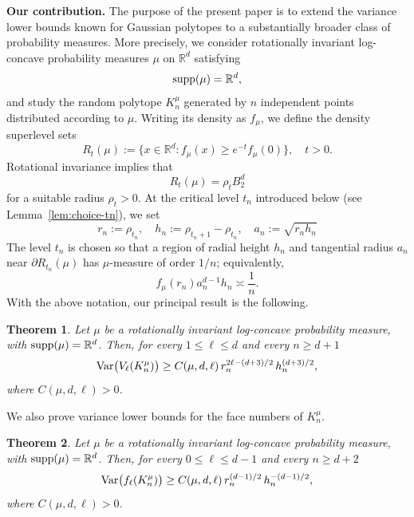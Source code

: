 \documentclass[10pt]{amsart}
\newcommand{\1}{\textbf{1}}
\newcommand{\Var}{{\rm Var}}
\numberwithin{equation}{section} %
\newtheorem{theorem}{Theorem}[section] %
\theoremstyle{remark}
\theoremstyle{definition}
\begin{document}
\textbf{Our contribution.} The purpose of the present paper is to extend the variance lower bounds
known for Gaussian polytopes to a substantially broader class of
probability measures. More precisely, we consider rotationally invariant
log-concave probability measures $\mu$ on $\mathbb{R}^d$ satisfying
\[
    {\rm supp}(\mu)=\mathbb{R}^d,
\]
and study the random polytope $K_n^\mu$ generated by $n$ independent points
distributed according to $\mu$. Writing its density as $f_{\mu}$,
we define the density superlevel sets
$$
R_t(\mu)
:=
\bigl\{x\in\mathbb{R}^d:f_\mu(x)\geq e^{-t}f_\mu(0)\bigr\}, \quad t>0.
$$
Rotational invariance implies that
$$
R_t(\mu)=\rho_tB_2^d
$$
for a suitable radius $\rho_t>0$. At the critical level $t_n$ introduced below (see Lemma~\ref{lem:choice-tn}), we set
$$
r_n:=\rho_{t_n},
\quad
h_n:=\rho_{t_n+1}-\rho_{t_n}, \quad a_n:=\sqrt{r_nh_n}
$$
The level $t_n$ is chosen so that a region of radial height $h_n$ and tangential radius $a_n$ near $\partial R_{t_n}(\mu)$ has $\mu$-measure of order $1/n$; equivalently,
$$
 f_\mu(r_n)a_n^{d-1}h_n\asymp \frac{1}{n}.
$$
With the above notation, our principal result is the following.

\begin{theorem}\label{thm:main-general-radial}
Let $\mu$ be a rotationally invariant log-concave probability measure, with ${\rm supp}(\mu)=\mathbb{R}^d$. Then, for every $1 \leq \ell \leq d$ and every $n \geq d+1$
\[
\Var\bigl(V_\ell(K_n^\mu)\bigr)
\geq
C(\mu, d,\ell) \,r_n^{2\ell-(d+3)/2}\,h_n^{(d+3)/2},
\] where $C(\mu,d,\ell)>0$.
\end{theorem}


We also prove variance lower bounds for the face numbers of $K_n^\mu$.

\begin{theorem}\label{thm:number-of faces}
Let $\mu$ be a rotationally invariant log-concave probability measure, with ${\rm supp}(\mu)=\mathbb{R}^d$. Then, for every $0 \leq \ell \leq d-1$ and every $n \geq d+2$
\[
\Var\bigl(f_\ell(K_n^\mu)\bigr)
\geq
C(\mu, d,\ell) \,r_n^{(d-1)/2}\,h_n^{-(d-1)/2},
\] where $C(\mu,d,\ell)>0$.
\end{theorem}
\end{document}
